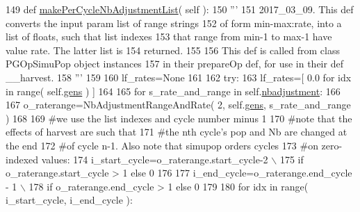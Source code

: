 \begin{DoxyCode}
149     \textcolor{keyword}{def }\hyperlink{classnegui_1_1pginputsimupop_1_1PGInputSimuPop_a2b7640b16f073f0b018b9269600e6023}{makePerCycleNbAdjustmentList}( self ):
150         \textcolor{stringliteral}{'''}
151 \textcolor{stringliteral}{        2017\_03\_09. This def converts the input param list of range strings }
152 \textcolor{stringliteral}{        of form min-max:rate, into a list of floats, such that list indexes }
153 \textcolor{stringliteral}{        that range from min-1 to max-1 have value rate.  The latter list is}
154 \textcolor{stringliteral}{        returned.}
155 \textcolor{stringliteral}{}
156 \textcolor{stringliteral}{        This def is called from class PGOpSimuPop object instances}
157 \textcolor{stringliteral}{        in their prepareOp def, for use in their def \_\_harvest.}
158 \textcolor{stringliteral}{        '''}
159 
160         lf\_rates=\textcolor{keywordtype}{None}
161 
162         \textcolor{keywordflow}{try}:
163             lf\_rates=[ 0.0 \textcolor{keywordflow}{for} idx \textcolor{keywordflow}{in} range( self.\hyperlink{classnegui_1_1pginputsimupop_1_1PGInputSimuPop_aceb30da861b01f9f89e7b2d1fe78ba32}{gens} ) ]
164             
165             \textcolor{keywordflow}{for} s\_rate\_and\_range \textcolor{keywordflow}{in} self.\hyperlink{classnegui_1_1pginputsimupop_1_1PGInputSimuPop_a709612c3a12e85de5ff97bc7d40f641a}{nbadjustment}:
166 
167                 o\_raterange=NbAdjustmentRangeAndRate( 2, self.\hyperlink{classnegui_1_1pginputsimupop_1_1PGInputSimuPop_aceb30da861b01f9f89e7b2d1fe78ba32}{gens}, s\_rate\_and\_range )
168 
169                 \textcolor{comment}{#we use the list indexes and cycle number minus 1   }
170                 \textcolor{comment}{#note that the effects of harvest are such that}
171                 \textcolor{comment}{#the nth cycle's pop and Nb are changed at the end}
172                 \textcolor{comment}{#of cycle n-1.  Also note that simupop orders cycles}
173                 \textcolor{comment}{#on zero-indexed values:}
174                 i\_start\_cycle=o\_raterange.start\_cycle-2 \(\backslash\)
175                             \textcolor{keywordflow}{if} o\_raterange.start\_cycle > 1 \textcolor{keywordflow}{else} 0
176 
177                 i\_end\_cycle=o\_raterange.end\_cycle - 1 \(\backslash\)
178                             \textcolor{keywordflow}{if} o\_raterange.end\_cycle > 1 \textcolor{keywordflow}{else} 0
179 
180                 \textcolor{keywordflow}{for} idx \textcolor{keywordflow}{in} range( i\_start\_cycle, i\_end\_cycle ):

\end{DoxyCode}
